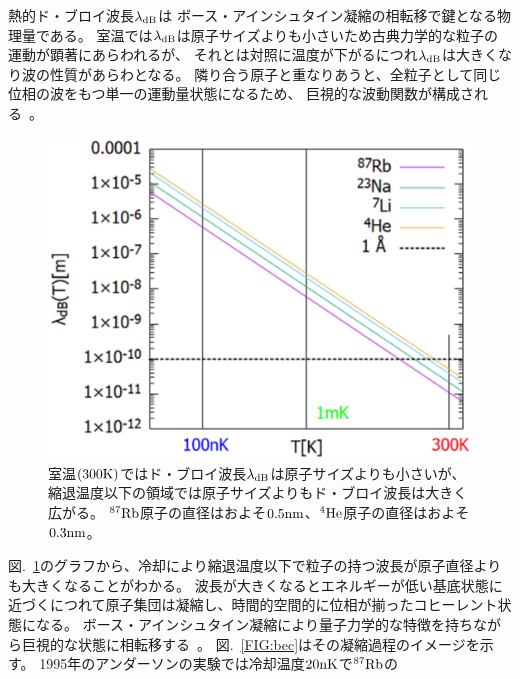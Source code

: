 \documentclass[12pt,a4paper]{jbook}
\begin{document}
        	熱的ド・ブロイ波長$\lambda_{{\rm dB}}$は
        	ボース・アインシュタイン凝縮の相転移で鍵となる物理量である。
        	室温では$\lambda_{{\rm dB}}$は原子サイズよりも小さいため古典力学的な粒子の運動が顕著にあらわれるが、
        	それとは対照に温度が下がるにつれ$\lambda_{{\rm dB}}$は大きくなり波の性質があらわとなる。
        	隣り合う原子と重なりあうと、全粒子として同じ位相の波をもつ単一の運動量状態になるため、
        	巨視的な波動関数が構成される~\cite{Pethick}。
		\begin{figure}[H]
			\begin{center}
				\includegraphics[width=14cm]{tlambda.eps}
				\caption{
					室温$(300{\rm K})$ではド・ブロイ波長$\lambda_{{\rm dB}}$は原子サイズよりも小さいが、
					縮退温度以下の領域では原子サイズよりもド・ブロイ波長は大きく広がる。
                    $^{87}{\rm Rb}$原子の直径はおよそ$0.5{\rm nm}$、$^{4}{\rm He}$原子の直径はおよそ$0.3{\rm nm}$。
				}
				\label{FIG:tlambda}
			\end{center}
		\end{figure}
		図.~\ref{FIG:tlambda}のグラフから、冷却により縮退温度以下で粒子の持つ波長が原子直径よりも大きくなることがわかる。
        	波長が大きくなるとエネルギーが低い基底状態に近づくにつれて原子集団は凝縮し、時間的空間的に位相が揃ったコヒーレント状態になる。
		ボース・アインシュタイン凝縮により量子力学的な特徴を持ちながら巨視的な状態に相転移する~\cite{Durfee}。
        	図.~\ref{FIG:bec}はその凝縮過程のイメージを示す。
		1995年のアンダーソンの実験では冷却温度$20{\rm nK}$で$^{87}{\rm Rb}$の
\end{document}
